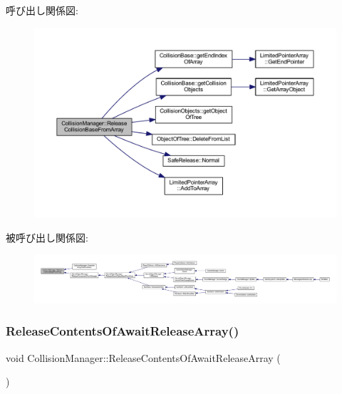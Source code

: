呼び出し関係図\+:
\nopagebreak
\begin{figure}[H]
\begin{center}
\leavevmode
\includegraphics[width=350pt]{class_collision_manager_a34318163f4256cebc7aefb95fc475030_cgraph}
\end{center}
\end{figure}
被呼び出し関係図\+:
\nopagebreak
\begin{figure}[H]
\begin{center}
\leavevmode
\includegraphics[width=350pt]{class_collision_manager_a34318163f4256cebc7aefb95fc475030_icgraph}
\end{center}
\end{figure}
\mbox{\label{class_collision_manager_a351353ddde07f2ff4f6642c8e1fc4ede}} 
\subsubsection{\texorpdfstring{Release\+Contents\+Of\+Await\+Release\+Array()}{ReleaseContentsOfAwaitReleaseArray()}}
{\footnotesize\ttfamily void Collision\+Manager\+::\+Release\+Contents\+Of\+Await\+Release\+Array (\begin{DoxyParamCaption}{ }\end{DoxyParamCaption})\hspace{0.3cm}{\ttfamily [private]}}



